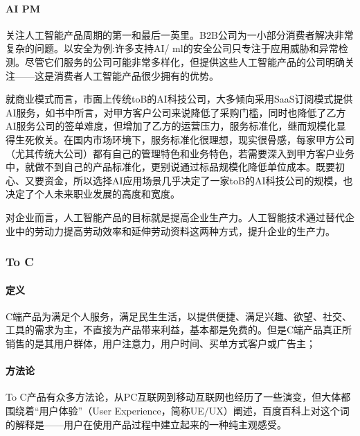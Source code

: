 \documentclass[letterpaper,11pt,english]{sphinxmanual}
\begin{document}
\paragraph{AI PM}
\label{\detokenize{chapter_introduction/2B:ai-pm}}
关注人工智能产品周期的第一和最后一英里。B2B公司为一小部分消费者解决非常复杂的问题。以安全为例:许多支持AI/
ml的安全公司只专注于应用威胁和异常检测。尽管它们服务的公司可能非常多样化，但提供这些人工智能产品的公司明确关注——这是消费者人工智能产品很少拥有的优势。

就商业模式而言，市面上传统toB的AI科技公司，大多倾向采用SaaS订阅模式提供AI服务，如书中所言，对甲方客户公司来说降低了采购门槛，同时也降低了乙方AI服务公司的签单难度，但增加了乙方的运营压力，服务标准化，继而规模化显得生死攸关。在国内市场环境下，服务标准化很理想，现实很骨感，每家甲方公司（尤其传统大公司）都有自己的管理特色和业务特色，若需要深入到甲方客户业务中，就做不到自己的产品标准化，更别说通过标品规模化降低单位成本。既要初心、又要资金，所以选择AI应用场景几乎决定了一家toB的AI科技公司的规模，也决定了个人未来职业发展的高度和宽度。

对企业而言，人工智能产品的目标就是提高企业生产力。人工智能技术通过替代企业中的劳动力提高劳动效率和延伸劳动资料这两种方式，提升企业的生产力。%
\begin{footnote}[26]\sphinxAtStartFootnote
{}
%
\end{footnote}


\subsubsection{To C}
\label{\detokenize{chapter_introduction/2C:to-c}}\label{\detokenize{chapter_introduction/2C::doc}}

\paragraph{定义}
\label{\detokenize{chapter_introduction/2C:id1}}
C端产品为满足个人服务，满足民生生活，以提供便捷、满足兴趣、欲望、社交、工具的需求为主，不直接为产品带来利益，基本都是免费的。但是C端产品真正所销售的是其用户群体，用户注意力，用户时间、买单方式客户或广告主；


\paragraph{方法论}
\label{\detokenize{chapter_introduction/2C:id2}}
To
C产品有众多方法论，从PC互联网到移动互联网也经历了一些演变，但大体都围绕着“用户体验”（User
Experience，简称UE/UX）阐述，百度百科上对这个词的解释是——用户在使用产品过程中建立起来的一种纯主观感受。
\end{document}
